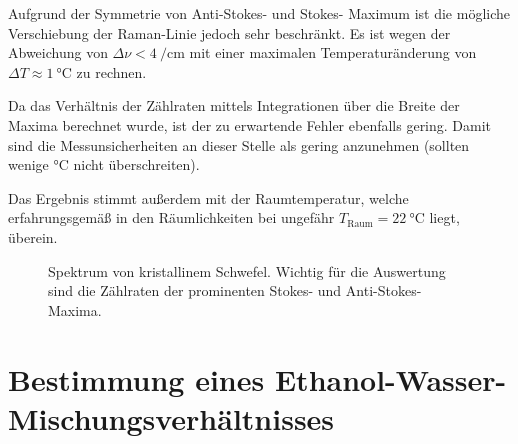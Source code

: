 \documentclass[../bericht.tex]{subfiles}
\begin{document}
    Aufgrund der Symmetrie von Anti-Stokes- und Stokes- Maximum ist die mögliche Verschiebung der Raman-Linie jedoch sehr beschränkt. Es ist wegen der Abweichung von $\Delta \nu <\SI{4}{\per\centi\meter}$ mit einer maximalen Temperaturänderung von $\Delta T\approx\SI{1}{\celsius}$ zu rechnen.

    Da das Verhältnis der Zählraten mittels Integrationen über die Breite der Maxima berechnet wurde, ist der zu erwartende Fehler ebenfalls gering. Damit sind die Messunsicherheiten an dieser Stelle als gering anzunehmen (sollten wenige $\si{\celsius}$ nicht überschreiten).

    Das Ergebnis stimmt außerdem mit der Raumtemperatur, welche erfahrungsgemäß in den Räumlichkeiten bei ungefähr $T_\mathrm{Raum}=\SI{22}{\celsius}$ liegt, überein.

    \begin{figure}[htb]
      \centering
      \caption[Spektrum von kristallinem Schwefel.]{Spektrum von kristallinem Schwefel. Wichtig für die Auswertung sind die Zählraten der prominenten Stokes- und Anti-Stokes-Maxima.}
      \label{fig:schwefel}
    \end{figure}

  \section{Bestimmung eines Ethanol-Wasser-Mischungsverhältnisses}
  \label{sec:ethanol}
\end{document}
